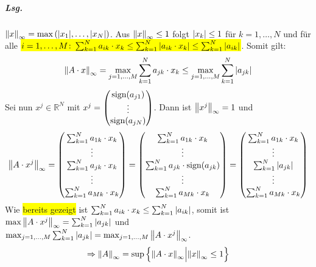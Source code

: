 \documentclass{scrreprt}
\newcommand\sign[1]{\text{sign}\qty(#1)}
\begin{document}
\begin{enumerate}[1)]
  \subparagraph{Lsg.} $\norm{x}_{\infty} = \max\qty(\abs{x_1}, \ldots, \abs{x_N})$.
  Aus $\norm{x}_{\infty} \leq 1$ folgt $\abs{x_k} \leq 1$ für $k = 1, \ldots, N$
  und für alle
  \colorbox{yellow}{$i = 1, \ldots, M \colon \sum_{k = 1}^N a_{ik} \cdot x_k
  \leq \sum_{k = 1}^N \abs{a_{ik} \cdot x_k} \leq \sum_{k = 1}^N \abs{a_{ik}}$}.
  Somit gilt:
  \[
    \norm{A \cdot x}_{\infty} = \max_{j = 1, \ldots, M} \sum_{k = 1}^N a_{jk} \cdot x_k
    \leq \max_{j = 1, \ldots, M} \sum_{k = 1}^N \abs{a_{jk}}
  \]
  Sei nun $x^j \in \mathbb{R}^N$ mit $x^j = \begin{pmatrix} \sign{a_{j1}} \\ \vdots \\ \sign{a_{jN}} \end{pmatrix}$.
  Dann ist $\norm{x^j}_{\infty} = 1$ und
  \[
    \norm{A \cdot x^j}_{\infty} = \begin{pmatrix}
      \sum_{k = 1}^N a_{1k} \cdot x_k \\
      \vdots \\
      \sum_{k = 1}^N a_{jk} \cdot x_k \\
      \vdots \\
      \sum_{k = 1}^N a_{Mk} \cdot x_k \\
    \end{pmatrix}
    = \begin{pmatrix}
      \sum_{k = 1}^N a_{1k} \cdot x_k \\
      \vdots \\
      \sum_{k = 1}^N a_{jk} \cdot \sign{a_{jk}} \\
      \vdots \\
      \sum_{k = 1}^N a_{Mk} \cdot x_k \\
    \end{pmatrix}
    = \begin{pmatrix}
      \sum_{k = 1}^N a_{1k} \cdot x_k \\
      \vdots \\
      \sum_{k = 1}^N \abs{a_{jk}} \\
      \vdots \\
      \sum_{k = 1}^N a_{Mk} \cdot x_k \\
    \end{pmatrix}
  \]
  Wie \colorbox{yellow}{bereits gezeigt} ist
  $\sum_{k = 1}^N a_{ik} \cdot x_k\leq \sum_{k = 1}^N \abs{a_{ik}}$,
  somit ist $\max\norm{A \cdot x^j}_{\infty} = \sum_{k = 1}^N \abs{a_{jk}}$
  und
  $\max_{j = 1, \ldots, M} \sum_{k = 1}^N \abs{a_{jk}} = \max_{j = 1, \ldots, M} \norm{A \cdot x^j}_{\infty}$.
  \[
    \Rightarrow \norm{A}_{\infty} = \sup\qty{\norm{A \cdot x}_{\infty} {\Big |} \norm{x}_{\infty} \leq 1 }
  \]
  \newpage
\end{enumerate}
\end{document}
